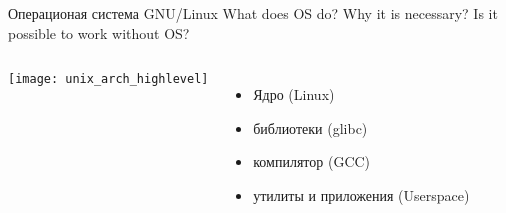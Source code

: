 \begin{frame}{Операционая система GNU/Linux}
What does OS do? Why it is necessary? Is it possible to work without OS?
\pause
    \begin{columns}
    \texttt{[image: unix\_arch\_highlevel]}
	\begin{itemize}
		\item Ядро (Linux)
		\item библиотеки (glibc)
                \item компилятор (GCC) 
		\item утилиты и приложения (Userspace)
	\end{itemize}
    \end{columns}
\end{frame}

